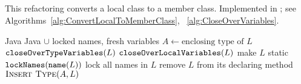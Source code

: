 \subsection{}
This refactoring converts a local class to a member class. Implemented in ; see Algorithms~\ref{alg:ConvertLocalToMemberClass},~%
\ref{alg:CloseOverVariables}.

\begin{algorithm}[p]
\caption{$\refactoring{Convert Local to Member Class}(L : \type{LocalClass}) : \type{MemberType}$}\label{alg:ConvertLocalToMemberClass}
\begin{algorithmic}[1]
\REQUIRE Java
\ENSURE Java $\cup$ locked names, fresh variables
\medskip
\STATE $A \leftarrow \text{enclosing type of $L$}$
\STATE $\text{\texttt{closeOverTypeVariables}}(L)$
\STATE $\text{\texttt{closeOverLocalVariables}}(L)$
  \STATE make $L$ static
\ENDIF
\STATE $\text{\texttt{lockNames}}(\text{\texttt{name}}(L))$
\STATE lock all names in $L$
\STATE remove $L$ from its declaring method
\STATE $\textsc{Insert Type}(A, L)$
\end{algorithmic}
\end{algorithm}

